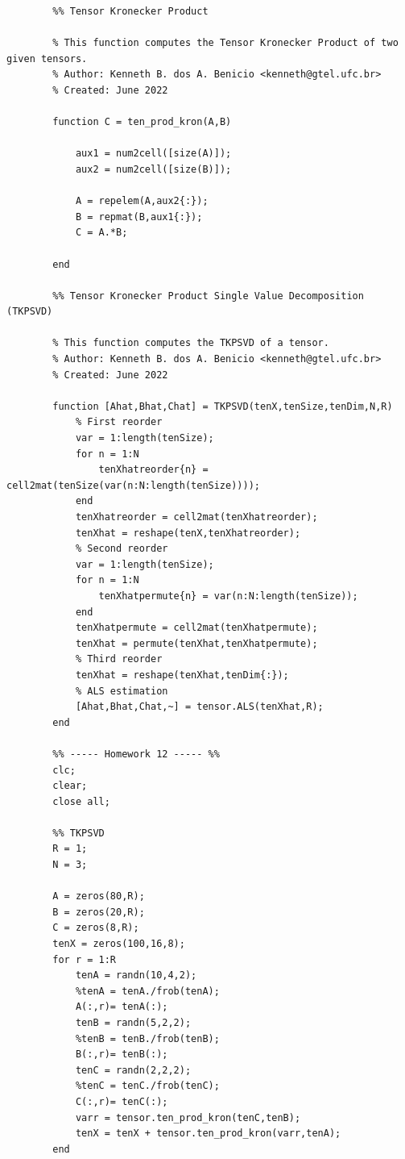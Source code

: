 \documentclass[a4paper,10pt]{article}
\begin{document}
    \begin{verbatim}
        %% Tensor Kronecker Product

        % This function computes the Tensor Kronecker Product of two given tensors. 
        % Author: Kenneth B. dos A. Benicio <kenneth@gtel.ufc.br>
        % Created: June 2022

        function C = ten_prod_kron(A,B)
            
            aux1 = num2cell([size(A)]);
            aux2 = num2cell([size(B)]);

            A = repelem(A,aux2{:});
            B = repmat(B,aux1{:});
            C = A.*B;
            
        end

        %% Tensor Kronecker Product Single Value Decomposition (TKPSVD)

        % This function computes the TKPSVD of a tensor.   
        % Author: Kenneth B. dos A. Benicio <kenneth@gtel.ufc.br>
        % Created: June 2022

        function [Ahat,Bhat,Chat] = TKPSVD(tenX,tenSize,tenDim,N,R)
            % First reorder
            var = 1:length(tenSize);
            for n = 1:N
                tenXhatreorder{n} = cell2mat(tenSize(var(n:N:length(tenSize))));
            end
            tenXhatreorder = cell2mat(tenXhatreorder);
            tenXhat = reshape(tenX,tenXhatreorder);
            % Second reorder
            var = 1:length(tenSize);
            for n = 1:N
                tenXhatpermute{n} = var(n:N:length(tenSize));
            end
            tenXhatpermute = cell2mat(tenXhatpermute);
            tenXhat = permute(tenXhat,tenXhatpermute);
            % Third reorder
            tenXhat = reshape(tenXhat,tenDim{:});
            % ALS estimation
            [Ahat,Bhat,Chat,~] = tensor.ALS(tenXhat,R);
        end

        %% ----- Homework 12 ----- %%
        clc;
        clear;
        close all;

        %% TKPSVD 
        R = 1;
        N = 3;

        A = zeros(80,R);
        B = zeros(20,R);
        C = zeros(8,R);
        tenX = zeros(100,16,8);
        for r = 1:R
            tenA = randn(10,4,2);
            %tenA = tenA./frob(tenA);
            A(:,r)= tenA(:);
            tenB = randn(5,2,2);
            %tenB = tenB./frob(tenB);
            B(:,r)= tenB(:);
            tenC = randn(2,2,2);
            %tenC = tenC./frob(tenC);
            C(:,r)= tenC(:);
            varr = tensor.ten_prod_kron(tenC,tenB);
            tenX = tenX + tensor.ten_prod_kron(varr,tenA);
        end


\end{verbatim}
\end{document}
